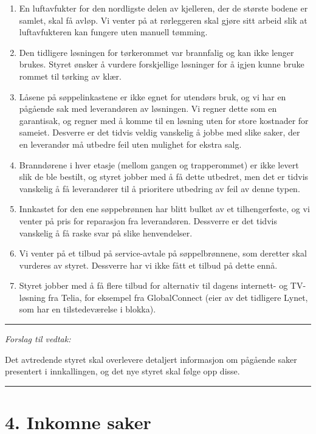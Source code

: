 \documentclass[12pt]{article}
\begin{document}
\begin{enumerate}
\item En luftavfukter for den nordligste delen av kjelleren, der de største bodene er samlet, skal
  få avløp. Vi venter på at rørleggeren skal gjøre sitt arbeid slik at luftavfukteren kan fungere uten manuell tømming.
\item Den tidligere løsningen for tørkerommet var brannfalig og kan ikke lenger brukes. Styret ønsker å
  vurdere forskjellige løsninger for å igjen kunne bruke rommet til tørking av klær.
\item Låsene på søppelinkastene er ikke egnet for utendørs bruk, og vi har en pågående sak med
  leverandøren av løsningen. Vi regner dette som en garantisak, og regner med å komme til en
  løsning uten for store kostnader for sameiet. Desverre er det tidvis veldig vanskelig å jobbe med
  slike saker, der en leverandør må utbedre feil uten mulighet for ekstra salg.
\item Branndørene i hver etasje (mellom gangen og trapperommet) er ikke levert slik de ble bestilt,
  og styret jobber med å få dette utbedret, men det er tidvis vanskelig å få leverandører til å
  prioritere utbedring av feil av denne typen.
\item Innkastet for den ene søppebrønnen har blitt bulket av et tilhengerfeste, og vi venter på
  pris for reparasjon fra leverandøren. Dessverre er det tidvis vanskelig å få raske svar på slike
  henvendelser.
\item Vi venter på et tilbud på service-avtale på søppelbrønnene, som deretter skal vurderes av
  styret. Dessverre har vi ikke fått et tilbud på dette ennå.
\item Styret jobber med å få flere tilbud for alternativ til dagens internett- og TV-løsning fra
  Telia, for eksempel fra GlobalConnect (eier av det tidligere Lynet, som har en tilstedeværelse i
  blokka).
\end{enumerate}

{\rule{\textwidth}{0.3pt}}

{\em Forslag til vedtak:}

Det avtredende styret skal overlevere detaljert informasjon om pågående saker presentert i
innkallingen, og det nye styret skal følge opp disse.\\
{\rule{\textwidth}{0.3pt}}


\section*{4. Inkomne saker}
\end{document}
